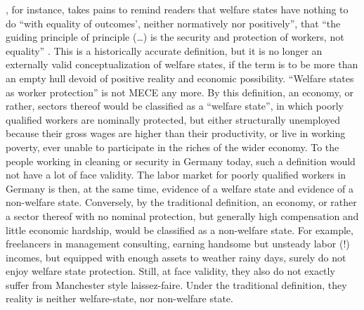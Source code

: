 \begin{enumerate}
	\citeauthor{Offe2003}, for instance, takes pains to remind readers that welfare states have nothing to do ``with equality of outcomes', neither normatively nor positively'', that ``the guiding principle of principle (\ldots) is the security and protection of workers, not equality'' \citeyearpar[450]{Offe2003}.
	This is a historically accurate definition, but it is no longer an externally valid conceptualization of welfare states, if the term is to be more than an empty hull devoid of positive reality and economic possibility.
	``Welfare states as worker protection'' is not \gls{MECE} any more.
	By this definition, an economy, or rather, sectors thereof would be classified as a ``welfare state'', in which poorly qualified workers are nominally protected, but either structurally unemployed because their gross wages are higher than their productivity, or live in working poverty, ever unable to participate in the riches of the wider economy.
	To the people working in cleaning or security in Germany today, such a definition would not have a lot of face validity.
	The labor market for poorly qualified workers in Germany is then, at the same time, evidence of a welfare state and evidence of a non-welfare state.
	Conversely, by the traditional definition, an economy, or rather a sector thereof with no nominal protection, but generally high compensation and little economic hardship, would be classified as a non-welfare state.
	For example, freelancers in management consulting, earning handsome but unsteady labor (!) incomes, but equipped with enough assets to weather rainy days, surely do not enjoy welfare state protection.
	Still, at face validity, they also do not exactly suffer from Manchester style laissez-faire.
	Under the traditional definition, they reality is neither welfare-state, nor non-welfare state.


\end{enumerate}
